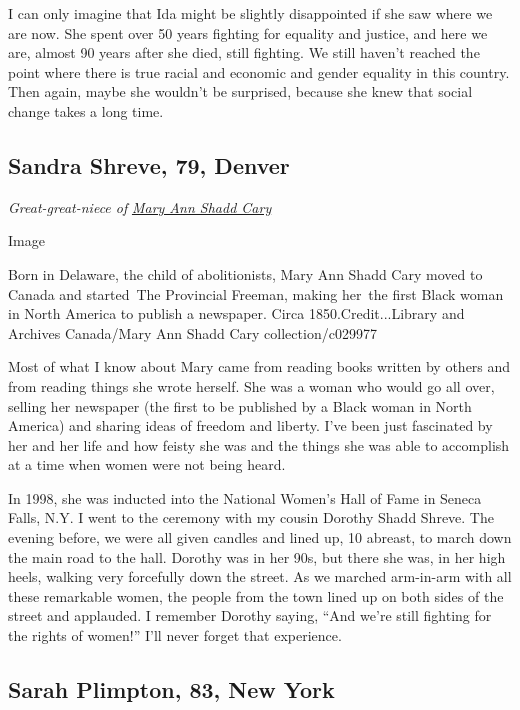 I can only imagine that Ida might be slightly disappointed if she saw
where we are now. She spent over 50 years fighting for equality and
justice, and here we are, almost 90 years after she died, still
fighting. We still haven't reached the point where there is true racial
and economic and gender equality in this country. Then again, maybe she
wouldn't be surprised, because she knew that social change takes a long
time.

\hypertarget{sandra-shreve-79-denver}{%
\subsection{Sandra Shreve, 79, Denver}\label{sandra-shreve-79-denver}}

\emph{Great-great-niece of}
\href{https://www.nytimes.com/2018/06/06/obituaries/mary-ann-shadd-cary-abolitionist-overlooked.html}{\emph{Mary
Ann Shadd Cary}}

Image

Born in Delaware, the child of abolitionists, Mary Ann Shadd Cary moved
to Canada and started~The Provincial Freeman, making her~the first Black
woman in North America to publish a newspaper. Circa
1850.Credit...Library and Archives Canada/Mary Ann Shadd Cary
collection/c029977

Most of what I know about Mary came from reading books written by others
and from reading things she wrote herself. She was a woman who would go
all over, selling her newspaper (the first to be published by a Black
woman in North America) and sharing ideas of freedom and liberty. I've
been just fascinated by her and her life and how feisty she was and the
things she was able to accomplish at a time when women were not being
heard.

In 1998, she was inducted into the National Women's Hall of Fame in
Seneca Falls, N.Y. I went to the ceremony with my cousin Dorothy Shadd
Shreve. The evening before, we were all given candles and lined up, 10
abreast, to march down the main road to the hall. Dorothy was in her
90s, but there she was, in her high heels, walking very forcefully down
the street. As we marched arm-in-arm with all these remarkable women,
the people from the town lined up on both sides of the street and
applauded. I remember Dorothy saying, ``And we're still fighting for the
rights of women!'' I'll never forget that experience.

\hypertarget{sarah-plimpton-83-new-york}{%
\subsection{Sarah Plimpton, 83, New
York}\label{sarah-plimpton-83-new-york}}

